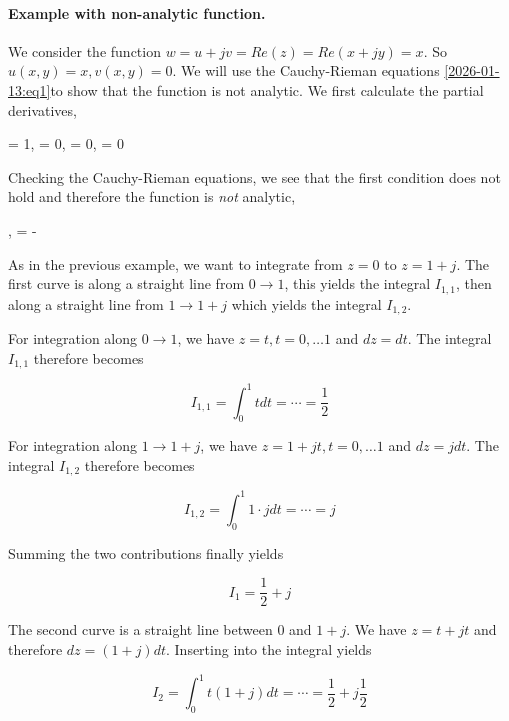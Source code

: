 \paragraph{Example with non-analytic function.} We consider the function $w = u+jv = Re(z) = Re(x+jy) = x$. So $u(x,y) = x, v(x,y) = 0$. We will use the Cauchy-Rieman equations \eqref{2026-01-13:eq1}to show that the function is not analytic. We first calculate the partial derivatives,

\bee
     = 1, \quad {} = 0, \quad {} = 0, \quad {} = 0
\eee

Checking the Cauchy-Rieman equations, we see that the first condition does not hold and therefore the function is \emph{not} analytic,

\bee
{} \neq {}, \quad {} = - 
\eee 


As in the previous example, we want to integrate from $z = 0$ to $z= 1+j$. The first curve is along a straight line from $0 \rightarrow 1$, this yields the integral $I_{1,1}$, then along a straight line from $1 \rightarrow 1+j$ which yields the integral $I_{1,2}$.

For integration along $0 \rightarrow 1$, we have $z = t, t=0,\ldots 1$ and $dz = dt$. The integral $I_{1,1}$ therefore becomes

\begin{equation*}
    I_{1,1} = \int_0^1 t dt = \cdots = \frac{1}{2}
\end{equation*}

For integration along $1 \rightarrow 1+j$, we have $z=1+jt, t=0,\ldots 1$ and $dz = j dt$. The integral $I_{1,2}$ therefore becomes

\begin{equation*}
    I_{1,2} = \int_0^1 1 \cdot j dt = \cdots = j
\end{equation*}

Summing the two contributions finally yields

\begin{equation*}
    I_{1} = \frac{1}{2} + j
\end{equation*}


The second curve is a straight line between $0$ and $1+j$. We have $z = t + j t$ and therefore $dz = (1+j) dt$. Inserting into the integral yields

\begin{equation*}
    I_{2} = \int_0^1 t (1+j) dt = \cdots = \frac{1}{2} + j \frac{1}{2}
\end{equation*}

